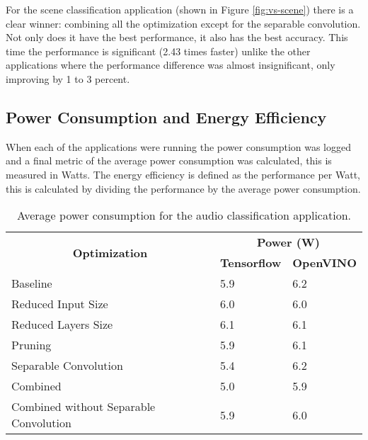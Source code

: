 For the scene classification application (shown in Figure \ref{fig:vs-scene}) there is a clear winner: combining all the optimization except for the separable convolution. Not only does it have the best performance, it also has the best accuracy. This time the performance is significant (2.43 times faster) unlike the other applications where the performance difference was almost insignificant, only improving by 1 to 3 percent.

\subsection{Power Consumption and Energy Efficiency}

When each of the applications were running the power consumption was logged and a final metric of the average power consumption was calculated, this is measured in Watts. The energy efficiency is defined as the performance per Watt, this is calculated by dividing the performance by the average power consumption.

\begin{table}[thbp]
\centering
\caption{Average power consumption for the audio classification application.}
\label{tab:eet-audio}
\begin{tabular}{|l|l|l|}
\hline
\multicolumn{1}{|c|}{\multirow{2}{*}{\textbf{Optimization}}} & \multicolumn{2}{c|}{\textbf{Power (W)}}                                           \\ \cline{2-3} 
\multicolumn{1}{|c|}{}                                       & \multicolumn{1}{c|}{\textbf{Tensorflow}} & \multicolumn{1}{c|}{\textbf{OpenVINO}} \\ \hline
Baseline                                                     & 5.9                 & 6.2               \\ \hline
Reduced Input Size                                           & 6.0                 & 6.0               \\ \hline
Reduced Layers Size                                          & 6.1                 & 6.1               \\ \hline
Pruning                                                      & 5.9                 & 6.1               \\ \hline
Separable Convolution                                        & 5.4                 & 6.2               \\ \hline
Combined                                                     & 5.0                 & 5.9               \\ \hline
Combined without Separable Convolution                       & 5.9                 & 6.0               \\ \hline
\end{tabular}
\end{table}

